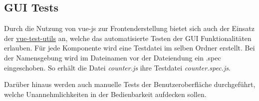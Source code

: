 \subsection{GUI Tests}
Durch die Nutzung von vue-js zur Frontenderstellung bietet sich auch der Einsatz der \href{https://vue-test-utils.vuejs.org/en/}{vue-test-utils} an, welche das automatisierte Testen der GUI Funktionalitäten erlauben. Für jede Komponente wird eine Testdatei im selben Ordner erstellt. Bei der Namensgebung wird im Dateinamen vor der Dateiendung ein .spec eingeschoben. So erhält die Datei \textit{counter.js} ihre Testdatei \textit{counter.spec.js}.

Darüber hinaus werden auch manuelle Tests der Benutzeroberfläche durchgeführt, welche Unannehmlichkeiten in der Bedienbarkeit aufdecken sollen.